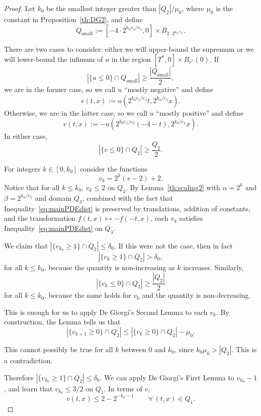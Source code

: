 \begin{proof}
Let $k_0$ be the smallest integer greater than $|Q_2|/\mu_0$,
where $\mu_0$ is the constant in Proposition~\ref{th:DG2}, and define 
\[ Q_\textrm{small} := [-4 \cdot 2^{k_0 e_1 / e_2},0] \times B_{2 \cdot 2^{k_0 / e_2}}. \] 


There are two cases to consider: either we will upper-bound the supremum or we will lower-bound the infimum of $u$ in the region $[T^\ast,0] \times B_{r^\ast}(0)$.  If
\[ |\{u \leq 0\} \cap Q_\textrm{small}| \geq \frac{|Q_\textrm{small}|}{2}, \]
we are in the former case, so we call $u$ ``mostly negative'' and define 
\[ v(t,x) := u(2^{k_0 e_1/e_2} t , 2^{k_0 / e_2} x). \]
Otherwise, we are in the latter case, so we call $u$ ``mostly positive'' and define
\[ v(t,x) := - u(2^{k_0 e_1 / e_2} (-4 - t) , 2^{k_0 / e_2} x). \]
In either case,
\[ |\{v \leq 0\} \cap Q_2| \geq \frac{Q_2}{2}. \]

For integers $k \in [0,k_0]$ consider the functions 
\[ v_k = 2^k (v - 2) + 2.\]  
Notice that for all $k \leq k_0$, $v_k \leq 2$ on $Q_3$.  By Lemma~\ref{th:scaling2} with $\alpha = 2^k$ and $\beta = 2^{k_0 / e_2}$ and domain $Q_3$, combined with the fact that Inequality~\eqref{eq:mainPDEdist} is preserved by translations, addition of constants, and the transformation $f(t,x) \mapsto -f(-t,x)$, each $v_k$ satisfies Inequality~\eqref{eq:mainPDEdist} on $Q_3$.  

We claim that $|\{v_{k_0} \geq 1\} \cap \overline{Q}_2|\leq \delta_0$.  If this were not the case, then in fact
\[ |\{v_k \geq 1\} \cap \overline{Q}_2| > \delta_0,\]
for all $k \leq k_0$, because the quantity is non-increasing as $k$ increases.  Similarly, 
\[ |\{v_k \leq 0\} \cap Q_2| \geq \frac{|Q_2|}{2}\]
for all $k \leq k_0$, because the same holds for $v_0$ and the quantity is non-decreasing.  

This is enough for us to apply De Giorgi's Second Lemma to each $v_k$.  By construction, the Lemma tells us that
\[ |\{v_{k+1} \geq 0\} \cap Q_2| \leq |\{v_k \geq 0\} \cap Q_2| - \mu_0.\]  

This cannot possibly be true for all $k$ between 0 and $k_0$, since $k_0 \mu_0 > |Q_2|$.  This is a contradiction.  

Therefore $|\{v_{k_0} \geq 1\} \cap \overline{Q}_2|\leq \delta_0$.  We can apply De Giorgi's First Lemma to $v_{k_0}-1$, and learn that $v_{k_0} \leq 3/2$ on $Q_1$.  In terms of $v$,  
\[ v(t,x) \leq 2 - 2^{-k_0-1} \qquad \forall \, (t,x) \in Q_1. \]


\end{proof}
